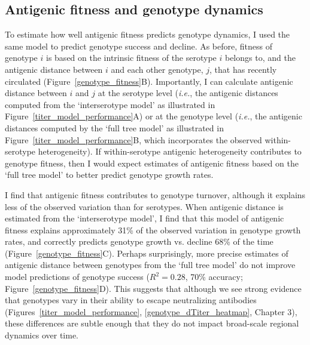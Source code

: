 \subsection{Antigenic fitness and genotype dynamics}
To estimate how well antigenic fitness predicts genotype dynamics, I used the same model to predict genotype success and decline.
As before, fitness of genotype $i$ is based on the intrinsic fitness of the serotype $i$ belongs to, and the antigenic distance between $i$ and each other genotype, $j$, that has recently circulated (Figure~\ref{genotype_fitness}B).
Importantly, I can calculate antigenic distance between $i$ and $j$ at the serotype level (\textit{i.e.}, the antigenic distances computed from the `interserotype model' as illustrated in Figure~\ref{titer_model_performance}A) or at the genotype level (\textit{i.e.}, the antigenic distances computed by the `full tree model' as illustrated in Figure~\ref{titer_model_performance}B, which incorporates the observed within-serotype heterogeneity).
If within-serotype antigenic heterogeneity contributes to genotype fitness, then I would expect estimates of antigenic fitness based on the `full tree model' to better predict genotype growth rates.

I find that antigenic fitness contributes to genotype turnover, although it explains less of the observed variation than for serotypes.
When antigenic distance is estimated from the `interserotype model', I find that this model of antigenic fitness explains approximately 31\% of the observed variation in genotype growth rates, and correctly predicts genotype growth vs. decline 68\% of the time (Figure~\ref{genotype_fitness}C).
Perhaps surprisingly, more precise estimates of antigenic distance between genotypes from the `full tree model' do not improve model predictions of genotype success ($R^2 = 0.28$, 70\% accuracy; Figure~\ref{genotype_fitness}D).
This suggests that although we see strong evidence that genotypes vary in their ability to escape neutralizing antibodies (Figures~\ref{titer_model_performance}, \ref{genotype_dTiter_heatmap}, Chapter 3), these differences are subtle enough that they do not impact broad-scale regional dynamics over time.


